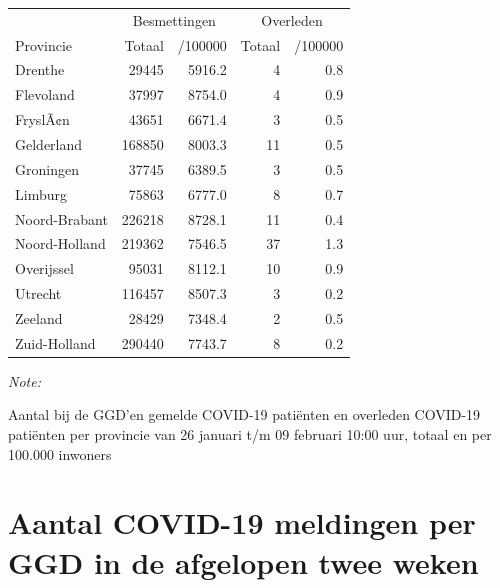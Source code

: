 \documentclass[
  english,
  man,floatsintext]{apa6}
\begin{document}
\begin{table}
\centering
\begin{threeparttable}
\begin{tabular}{lrrrr}
\toprule
\multicolumn{1}{c}{ } & \multicolumn{2}{c}{Besmettingen} & \multicolumn{2}{c}{Overleden} \\
\cmidrule(l{3pt}r{3pt}){2-3} \cmidrule(l{3pt}r{3pt}){4-5}
Provincie & Totaal & /100000 & Totaal & /100000\\
\midrule
Drenthe & 29445 & 5916.2 & 4 & 0.8\\
Flevoland & 37997 & 8754.0 & 4 & 0.9\\
FryslÃ¢n & 43651 & 6671.4 & 3 & 0.5\\
Gelderland & 168850 & 8003.3 & 11 & 0.5\\
Groningen & 37745 & 6389.5 & 3 & 0.5\\
Limburg & 75863 & 6777.0 & 8 & 0.7\\
Noord-Brabant & 226218 & 8728.1 & 11 & 0.4\\
Noord-Holland & 219362 & 7546.5 & 37 & 1.3\\
Overijssel & 95031 & 8112.1 & 10 & 0.9\\
Utrecht & 116457 & 8507.3 & 3 & 0.2\\
Zeeland & 28429 & 7348.4 & 2 & 0.5\\
Zuid-Holland & 290440 & 7743.7 & 8 & 0.2\\
\bottomrule
\end{tabular}
\begin{tablenotes}
\item \textit{Note: } 
\item Aantal bij de GGD’en gemelde COVID-19 patiënten en overleden COVID-19 patiënten per provincie van 26 januari t/m 09 februari 10:00 uur, totaal en per 100.000 inwoners
\end{tablenotes}
\end{threeparttable}
\end{table}

\newpage

\hypertarget{aantal-covid-19-meldingen-per-ggd-in-de-afgelopen-twee-weken}{%
\section{Aantal COVID-19 meldingen per GGD in de afgelopen twee weken}\label{aantal-covid-19-meldingen-per-ggd-in-de-afgelopen-twee-weken}}
\end{document}
